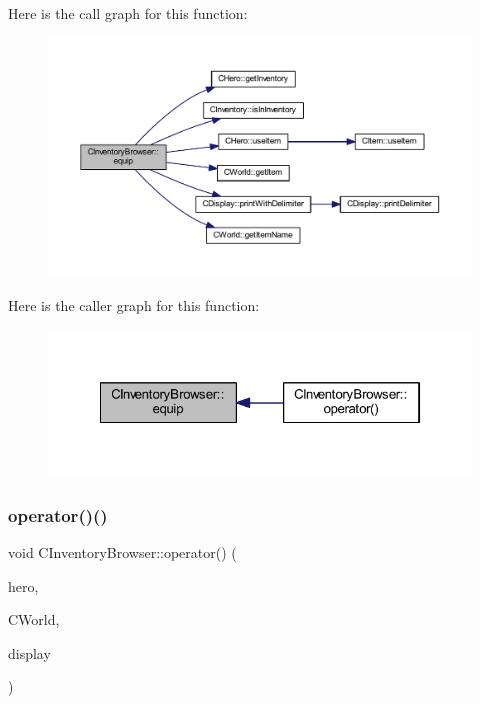 Here is the call graph for this function\+:\nopagebreak
\begin{figure}[H]
\begin{center}
\leavevmode
\includegraphics[width=350pt]{class_c_inventory_browser_ac865349ca08d9402c869d8e5450c689a_cgraph}
\end{center}
\end{figure}
Here is the caller graph for this function\+:\nopagebreak
\begin{figure}[H]
\begin{center}
\leavevmode
\includegraphics[width=322pt]{class_c_inventory_browser_ac865349ca08d9402c869d8e5450c689a_icgraph}
\end{center}
\end{figure}
\mbox{\label{class_c_inventory_browser_a91c51766048ba5629b125b9a444d31bb}} 
\subsubsection{\texorpdfstring{operator()()}{operator()()}}
{\footnotesize\ttfamily void C\+Inventory\+Browser\+::operator() (\begin{DoxyParamCaption}\item[{\mbox{\hyperlink{class_c_hero}{C\+Hero}} \&}]{hero,  }\item[{const \mbox{\hyperlink{class_c_world}{C\+World}} \&}]{C\+World,  }\item[{const \mbox{\hyperlink{class_c_display}{C\+Display}} \&}]{display }\end{DoxyParamCaption})}

